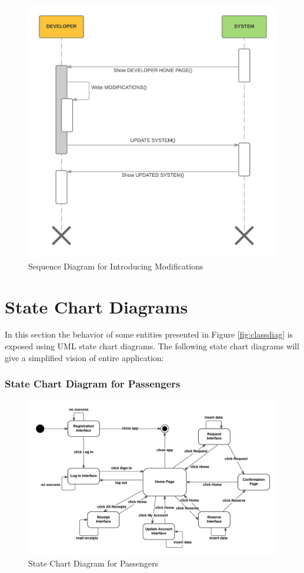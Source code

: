 \begin{figure}[htbp]
\centering
\includegraphics[width=\textwidth]{cpt/img/SequenceModify}
\caption{Sequence Diagram for Introducing Modifications}
\end{figure}
\clearpage

\section{State Chart Diagrams}
In this section the behavior of some entities presented in Figure \ref{fig:classdiag} is exposed using UML state chart diagrams. The following state chart diagrams will give a simplified vision of entire application:

\subsubsection{State Chart Diagram for Passengers}

\begin{figure}[htbp]
\centering
\includegraphics[width=\textwidth]{cpt/img/StateChartPass}
\caption{State Chart Diagram for Passengers}
\end{figure}
\clearpage

